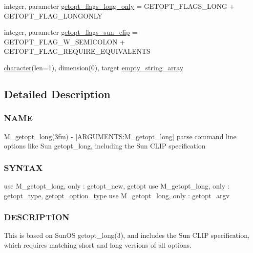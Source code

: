 \begin{DoxyCompactItemize}
\item 
integer, parameter \hyperlink{namespacem__getopt__long_a86d2892a8786516f1b523c6bc1f373fa}{getopt\+\_\+flags\+\_\+long\+\_\+only} = G\+E\+T\+O\+P\+T\+\_\+\+F\+L\+A\+G\+S\+\_\+\+L\+O\+NG + G\+E\+T\+O\+P\+T\+\_\+\+F\+L\+A\+G\+\_\+\+L\+O\+N\+G\+O\+N\+LY
\item 
integer, parameter \hyperlink{namespacem__getopt__long_a752a8bccdeb9074237cfaa0c9435c059}{getopt\+\_\+flags\+\_\+sun\+\_\+clip} = G\+E\+T\+O\+P\+T\+\_\+\+F\+L\+A\+G\+\_\+\+W\+\_\+\+S\+E\+M\+I\+C\+O\+L\+ON + G\+E\+T\+O\+P\+T\+\_\+\+F\+L\+A\+G\+\_\+\+R\+E\+Q\+U\+I\+R\+E\+\_\+\+E\+Q\+U\+I\+V\+A\+L\+E\+N\+TS
\item 
\hyperlink{option__stopwatch_83_8txt_abd4b21fbbd175834027b5224bfe97e66}{character}(len=1), dimension(0), target \hyperlink{namespacem__getopt__long_a6f74fcf9d3fc08c69e4df052af120051}{empty\+\_\+string\+\_\+array}
\end{DoxyCompactItemize}


\subsection{Detailed Description}
\subsubsection*{N\+A\+ME}

M\+\_\+getopt\+\_\+long(3fm) -\/ \mbox{[}A\+R\+G\+U\+M\+E\+N\+TS\+:M\+\_\+getopt\+\_\+long\mbox{]} parse command line options like Sun getopt\+\_\+long, including the Sun C\+L\+IP specification \subsubsection*{S\+Y\+N\+T\+AX}

use M\+\_\+getopt\+\_\+long, only \+: getopt\+\_\+new, getopt use M\+\_\+getopt\+\_\+long, only \+: \hyperlink{structm__getopt__long_1_1getopt__type}{getopt\+\_\+type}, \hyperlink{structm__getopt__long_1_1getopt__option__type}{getopt\+\_\+option\+\_\+type} use M\+\_\+getopt\+\_\+long, only \+: getopt\+\_\+argv 

\subsubsection*{D\+E\+S\+C\+R\+I\+P\+T\+I\+ON}

This is based on Sun\+OS getopt\+\_\+long(3), and includes the Sun C\+L\+IP specification, which requires matching short and long versions of all options.

